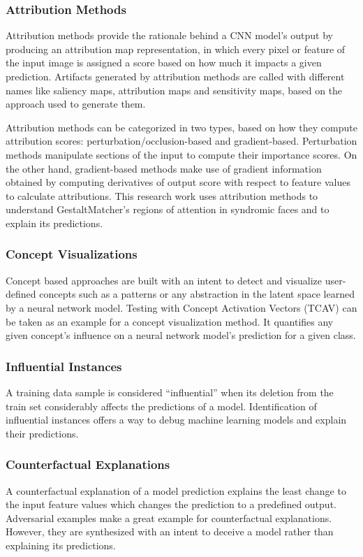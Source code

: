 \documentclass[../report.tex]{subfiles}
\begin{document}
	\subsubsection{Attribution Methods}
	Attribution methods provide the rationale behind a CNN model's output by producing an attribution map representation, in which every pixel or feature of the input image is assigned a score based on how much it impacts a given prediction. Artifacts generated by attribution methods are called with different names like saliency maps, attribution maps and sensitivity maps, based on the approach used to generate them.
	
	Attribution methods can be categorized in two types, based on how they compute attribution scores:  perturbation/occlusion-based and gradient-based. Perturbation methods manipulate sections of the input to compute their importance scores. On the other hand, gradient-based methods make use of gradient information obtained by computing derivatives of output score with respect to feature values to calculate attributions. This research work uses attribution methods to understand GestaltMatcher's regions of attention in syndromic faces and to explain its predictions.
	\subsubsection{Concept Visualizations}
	Concept based approaches are built with an intent to detect and visualize user-defined concepts such as a patterns or any abstraction in the latent space learned by a neural network model.  Testing with Concept Activation Vectors (TCAV) \cite{tcav} can be taken as an example for a concept visualization method. It quantifies any given concept's influence on a neural network model's prediction for a given class.
	
	\subsubsection{Influential Instances}
	A training data sample is considered \enquote{influential} when its deletion from the train set considerably affects the predictions of a model. Identification of influential instances offers a way to debug machine learning models and explain their predictions.
	
	\subsubsection{Counterfactual Explanations}
	A counterfactual explanation of a model prediction explains the least change to the input feature values which changes the prediction to a predefined output. Adversarial examples \cite{} make a great example for counterfactual explanations. However, they are synthesized with an intent to deceive a model rather than explaining its predictions.
\end{document}
